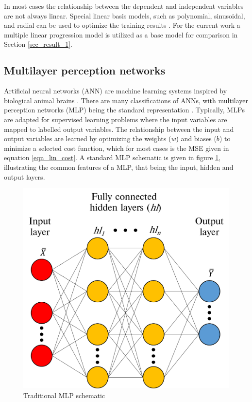 \documentclass[a4paper,fleqn]{cas-dc}
\begin{document}
In most cases the relationship between the dependent and independent variables are not always linear. Special linear basis models, such as polynomial, sinusoidal, and radial can be used to optimize the training results \cite{Rasmussen2006}. For the current work a multiple linear progression model is utilized as a base model for comparison in Section \ref{sec_result_1}. 
\subsection{Multilayer perception networks}
Artificial neural networks (ANN) are machine learning systems inspired by biological animal brains \cite{Rasmussen2006}. There are many classifications of ANNs, with multilayer perception networks (MLP) being the standard representation \citep{goodfellow}. Typically, MLPs are adapted for supervised learning problems where the input variables are mapped to labelled output variables. The relationship between the input and output variables are learned by optimizing the weights ($\overline{w}$) and biases ($\overline{b}$) to minimize a selected cost function, which for most cases is the MSE given in equation \ref{eqn_lin_cost}. A standard MLP schematic is given in figure \ref{fig_mlp_schematic}, illustrating the common features of a MLP, that being the input, hidden and output layers.\\
\begin{figure}[h!]
	\centering
		\includegraphics[scale=0.5]{ML_SCHEMATIC}
	  \caption{Traditional MLP schematic}\label{fig_mlp_schematic}
\end{figure}
\end{document}

